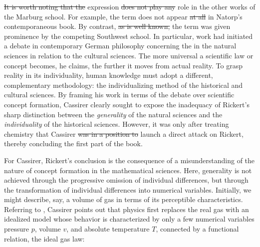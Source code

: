 \documentclass[submitted,12pt]{article}
\providecommand{\DIFadd}[1]{{\protect\color{blue}\uwave{#1}}} %
\providecommand{\DIFdel}[1]{{\protect\color{red}\sout{#1}}}                      %
\providecommand{\DIFaddbegin}{} %
\providecommand{\DIFaddend}{} %
\providecommand{\DIFdelbegin}{} %
\providecommand{\DIFdelend}{} %
\begin{document}


\DIFdelbegin \DIFdel{It is worth noting that the }\DIFdelend \DIFaddbegin \DIFadd{The }\DIFaddend expression   \DIFdelbegin \DIFdel{does not play any }\DIFdelend \DIFaddbegin \DIFadd{plays no }\DIFaddend role in the other works of the Marburg school. For example, the term does not appear \DIFdelbegin \DIFdel{at all }\DIFdelend in Natorp's contemporaneous \citeyear{Natorp1910a} book. By contrast, \DIFdelbegin \DIFdel{as is well known, }\DIFdelend the term was given prominence by the competing Southwest school. In particular,  work had initiated a debate in contemporary German philosophy concerning the  in the natural sciences in relation to the cultural sciences. The more universal a scientific law or concept becomes, he claims, the further it moves from actual reality. To grasp reality in its individuality, human knowledge must adopt a different, complementary methodology: the individualizing method of the historical and cultural sciences. By framing his work in terms of the debate over scientific concept formation, Cassirer clearly sought to expose the inadequacy of Rickert's sharp distinction between the \emph{generality} of the natural sciences and the \emph{individuality} of the historical sciences. However, it was only after treating chemistry that Cassirer \DIFdelbegin \DIFdel{was in a position to }\DIFdelend \DIFaddbegin \DIFadd{could }\DIFaddend launch a direct attack on Rickert, thereby concluding the first part of the book.

For Cassirer, Rickert's conclusion is the consequence of a misunderstanding of the nature of concept formation in the mathematical sciences. Here, generality is not achieved through the progressive omission of individual differences, but through the transformation of individual differences into numerical variables. Initially, we might describe, say, a volume of gas in terms of its perceptible characteristics. Referring to \citet{Duhem1906}, Cassirer points out that physics first replaces the real gas with an idealized model whose behavior is characterized by only a few numerical variables \SF{189--90}{143--44}\DIFdelbegin \DIFdel{, }\DIFdelend \DIFaddbegin \DIFadd{: }\DIFaddend pressure $p$, volume $v$, and absolute temperature $T$, connected by a functional relation, the ideal gas law:  
\end{document}
